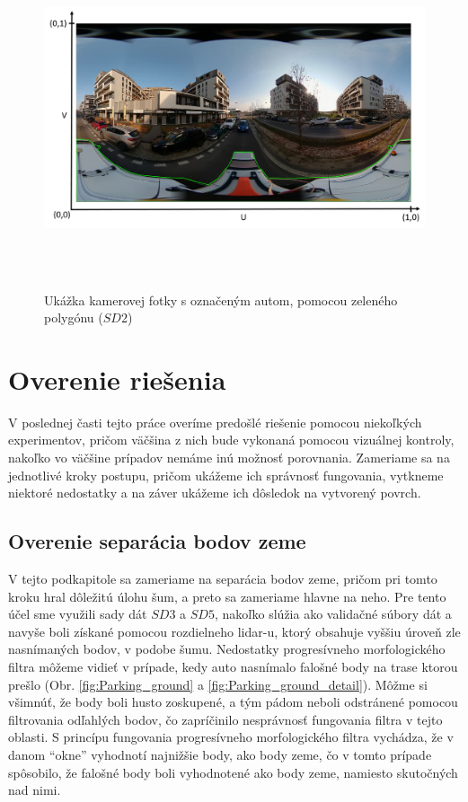 \vfill
\begin{figure}[H]
  \centering
  \includegraphics[width=16cm, height=10cm]{img/texture_camera_image.png}
  \caption{Ukážka kamerovej fotky s označeným autom, pomocou zeleného polygónu ($SD2$)} 
  \label{fig:texture_camera_image}
\end{figure} 
\vfill\clearpage

\section{Overenie riešenia}
\noindent V poslednej časti tejto práce overíme predošlé riešenie pomocou niekoľkých experimentov, pričom väčšina z nich bude vykonaná pomocou vizuálnej kontroly, nakoľko vo väčšine prípadov nemáme inú možnosť porovnania. Zameriame sa na jednotlivé kroky postupu, pričom ukážeme ich správnosť fungovania, vytkneme niektoré nedostatky a na záver ukážeme ich dôsledok na vytvorený povrch.

\subsection{Overenie separácia bodov zeme}
\noindent V tejto podkapitole sa zameriame na separácia bodov zeme, pričom pri tomto kroku hral dôležitú úlohu šum, a preto sa zameriame hlavne na neho. Pre tento účel sme využili sady dát $SD3$ a $SD5$, nakoľko slúžia ako validačné súbory dát a navyše boli získané pomocou rozdielneho \acrshort{lidar}-u, ktorý obsahuje vyššiu úroveň zle nasnímaných bodov, v podobe šumu.
\newline\indent Nedostatky progresívneho morfologického filtra môžeme vidieť v prípade, kedy auto nasnímalo falošné body na trase ktorou prešlo (Obr. \ref{fig:Parking_ground} a  \ref{fig:Parking_ground_detail}). Môžme si všimnúť, že body boli husto zoskupené, a tým pádom neboli odstránené pomocou filtrovania odľahlých bodov, čo zapríčinilo nesprávnosť fungovania filtra v tejto oblasti. S princípu fungovania progresívneho morfologického filtra vychádza, že v danom ``okne''  vyhodnotí najnižšie body, ako body zeme, čo v tomto prípade spôsobilo, že falošné body boli vyhodnotené ako body zeme, namiesto skutočných nad nimi.

